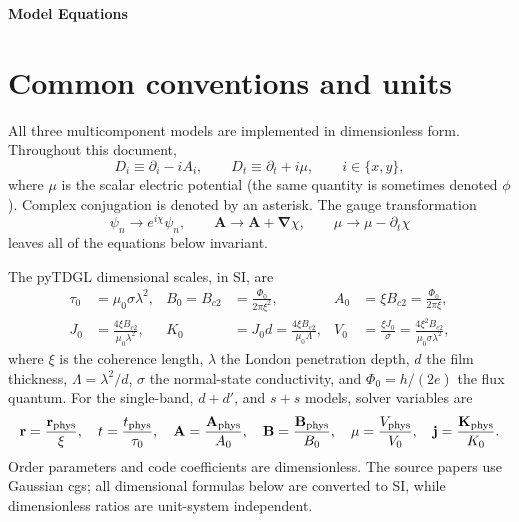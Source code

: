 \documentclass[11pt]{article}
\begin{document}
\thispagestyle{empty}
\bigskip
\vspace{0.1cm}

{\fontsize{18}{18} \selectfont \bf \sffamily Model Equations}

\section*{Common conventions and units \cite{BishopVanHorn2023}}

All three multicomponent models are implemented in dimensionless form.  Throughout
this document,
\begin{equation}
    D_i \equiv \partial_i-iA_i,\qquad
    D_t \equiv \partial_t+i\mu,\qquad i\in\{x,y\},
    \label{eq:covariant-derivatives}
\end{equation}
where $\mu$ is the scalar electric potential (the same quantity is sometimes
denoted $\phi$).  Complex conjugation is denoted by an asterisk.  The gauge
transformation
\begin{equation}
    \psi_n\rightarrow e^{i\chi}\psi_n,\qquad
    \mathbf A\rightarrow\mathbf A+\boldsymbol\nabla\chi,\qquad
    \mu\rightarrow\mu-\partial_t\chi
\end{equation}
leaves all of the equations below invariant.

The pyTDGL dimensional scales, in SI, are~\cite{BishopVanHorn2023}
\begin{align}
    \tau_0 &= \mu_0\sigma\lambda^2,
    &B_0=B_{c2}&=\frac{\Phi_0}{2\pi\xi^2},
    &A_0&=\xi B_{c2}=\frac{\Phi_0}{2\pi\xi},\\
    J_0&=\frac{4\xi B_{c2}}{\mu_0\lambda^2},
    &K_0&=J_0d=\frac{4\xi B_{c2}}{\mu_0\Lambda},
    &V_0&=\frac{\xi J_0}{\sigma}
        =\frac{4\xi^2B_{c2}}{\mu_0\sigma\lambda^2},
    \label{eq:physical-scales}
\end{align}
where $\xi$ is the coherence length, $\lambda$ the London penetration depth,
$d$ the film thickness, $\Lambda=\lambda^2/d$, $\sigma$ the normal-state
conductivity, and $\Phi_0=h/(2e)$ the flux quantum.  For the single-band,
$d+d'$, and $s+s$ models, solver variables are
\begin{equation}
    \mathbf r=\frac{\mathbf r_{\rm phys}}{\xi},\quad
    t=\frac{t_{\rm phys}}{\tau_0},\quad
    \mathbf A=\frac{\mathbf A_{\rm phys}}{A_0},\quad
    \mathbf B=\frac{\mathbf B_{\rm phys}}{B_0},\quad
    \mu=\frac{V_{\rm phys}}{V_0},\quad
    \mathbf j=\frac{\mathbf K_{\rm phys}}{K_0}.
    \label{eq:dimensionless-variables}
\end{equation}
Order parameters and code coefficients are dimensionless.  The source papers
use Gaussian cgs; all dimensional formulas below are converted to SI, while
dimensionless ratios are unit-system independent.
\end{document}
